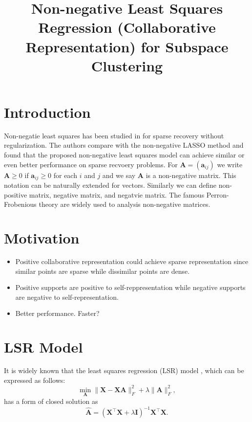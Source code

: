 \documentclass[10pt,twocolumn,letterpaper]{article}
\begin{document}
\title{Non-negative Least Squares Regression (Collaborative Representation) for Subspace Clustering}

\maketitle



\begin{abstract}

\end{abstract}

\section{Introduction}

Non-negatie least squares has been studied in \cite{slawski2013non} for sparse recovery without regularization. The authors compare with the non-negative LASSO method \cite{kim2007interior} and found that the proposed non-negative least squares model can achieve similar or even better performance on sparse recvoery problems. For $\bm{A}=(\bm{a}_{ij})$ we write $\bm{A}\ge0$ if $\bm{a}_{ij}\ge0$ for each $i$ and $j$ and we say $\bm{A}$ is a non-negative matrix. This notation can be naturally extended for vectors. Similarly we can define non-positive matrix, negative matrix, and negatvie matrix. The famous Perron-Frobenious theory are widely used to analysis non-negative matrices.

\section{Motivation}

\begin{itemize}
\item Positive collaborative representation could achieve sparse representation since similar points are sparse while dissimilar points are dense.

\item Positive supports are positive to self-reppresentation while negative supports are negative to self-representation.

\item Better performance. Faster? 
\end{itemize}

\section{LSR Model}
It is widely known that the least squares regression (LSR) model \cite{prml}, which can be expressed as follows:
\begin{equation}
\label{e1}
\min_{\bm{A}}
\|
\bm{X}
-
\bm{X}\bm{A}
\|_{F}^{2}
+
\lambda
\|
\bm{A}
\|_{F}^{2}
,
\end{equation}
has a form of closed solution as
\begin{equation}
\label{e2}
\hat{\bm{A}}
=
(\bm{X}^{\top}\bm{X}+\lambda\bm{I})^{-1}\bm{X}^{\top}\bm{X}.
\end{equation}
\end{document}
